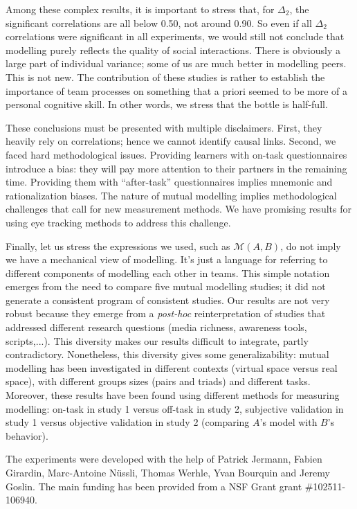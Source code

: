 \documentclass[natbib]{svjour3}
\newcommand{\gmodel}[2]{{$\mathcal{M}(#1, #2)$}}
\begin{document}
Among these complex results, it is important to stress that, for $\Delta_2$, the
significant correlations are all below 0.50, not around 0.90.  So even if all
$\Delta_2$ correlations were significant in all experiments, we would still not
conclude that modelling purely reflects the quality of social interactions.
There is obviously a large part of individual variance; some of us are much
better in modelling peers. This is not new. The contribution of these studies is
rather to establish the importance of team processes on something that a priori
seemed to be more of a personal cognitive skill.  In other words, we stress that
the bottle is half-full. 

These conclusions must be presented with multiple disclaimers. First, they
heavily rely on correlations; hence we cannot identify causal links. Second, we
faced hard methodological issues. Providing learners with on-task questionnaires
introduce a bias: they will pay more attention to their partners in the
remaining time. Providing them with ``after-task'' questionnaires implies mnemonic
and rationalization biases. The nature of mutual modelling implies methodological
challenges that call for new  measurement methods. We have promising results for
using eye tracking methods to address this challenge.

Finally, let us stress the expressions we used, such as \gmodel{A}{B}, do not
imply we have a mechanical view of modelling. It's just a language for referring
to different components of modelling each other in teams.  This simple notation
emerges from the need to compare five mutual modelling studies; it did not
generate a consistent program of consistent studies.  Our results are not very
robust because they emerge from a \emph{post-hoc} reinterpretation of studies
that addressed different research questions (media richness, awareness tools,
scripts,...). This diversity makes our results difficult to integrate, partly
contradictory. Nonetheless, this diversity gives some generalizability: mutual
modelling has been investigated in different contexts (virtual space versus real
space), with different groups sizes (pairs and triads) and different tasks.
Moreover, these results have been found using different methods for measuring
modelling: on-task in study 1 versus off-task in study 2, subjective validation
in study 1 versus objective validation in study 2 (comparing $A$'s model with $B$'s
behavior).

\begin{acknowledgements}

The experiments were developed with the help of Patrick Jermann,  Fabien
Girardin, Marc-Antoine Nüssli, Thomas Werhle, Yvan Bourquin and  Jeremy Goslin.
The main funding has been provided from a NSF Grant grant \#102511-106940.

\end{acknowledgements}



\end{document}
